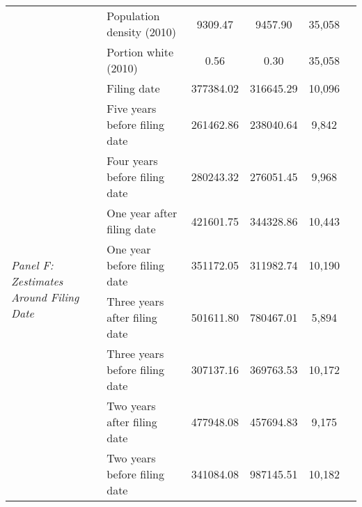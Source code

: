 \begin{tabular}{llcccc}
 & Population density (2010) & 9309.47 & 9457.90 & 35,058 \\
 & Portion white (2010) & 0.56 & 0.30 & 35,058 \\
\cline{1-5}
\multirow[c]{9}{4cm}{\textit{Panel F: Zestimates Around Filing Date}} & Filing date & 377384.02 & 316645.29 & 10,096 \\
 & Five years before filing date & 261462.86 & 238040.64 & 9,842 \\
 & Four years before filing date & 280243.32 & 276051.45 & 9,968 \\
 & One year after filing date & 421601.75 & 344328.86 & 10,443 \\
 & One year before filing date & 351172.05 & 311982.74 & 10,190 \\
 & Three years after filing date & 501611.80 & 780467.01 & 5,894 \\
 & Three years before filing date & 307137.16 & 369763.53 & 10,172 \\
 & Two years after filing date & 477948.08 & 457694.83 & 9,175 \\
 & Two years before filing date & 341084.08 & 987145.51 & 10,182 \\
\cline{1-5}
\bottomrule
\end{tabular}
